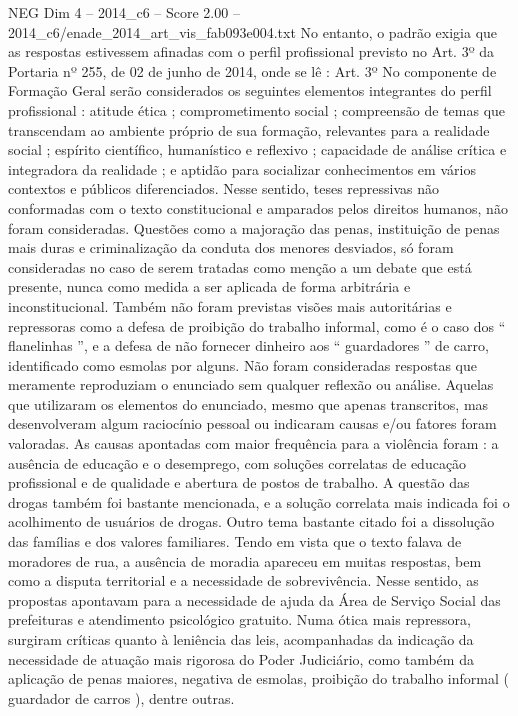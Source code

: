 \begin{textsample}{NEG Dim 4 – 2014\_c6 – Score 2.00 – 2014\_c6/enade\_2014\_art\_vis\_fab093e004.txt}
No entanto, o padrão exigia que as respostas estivessem afinadas com o perfil profissional previsto no Art. 3º da Portaria nº 255, de 02 de junho de 2014, onde se lê : Art. 3º No componente de Formação Geral serão considerados os seguintes elementos integrantes do perfil profissional : atitude ética ; comprometimento social ; compreensão de temas que transcendam ao ambiente próprio de sua formação, relevantes para a realidade social ; espírito científico, humanístico e reflexivo ; capacidade de análise crítica e integradora da realidade ; e aptidão para socializar conhecimentos em vários contextos e públicos diferenciados.
Nesse sentido, teses repressivas não conformadas com o texto constitucional e amparados pelos direitos humanos, não foram consideradas.
Questões como a majoração das penas, instituição de penas mais duras e criminalização da conduta dos menores desviados, só foram consideradas no caso de serem tratadas como menção a um debate que está presente, nunca como medida a ser aplicada de forma arbitrária e inconstitucional.
Também não foram previstas visões mais autoritárias e repressoras como a defesa de proibição do trabalho informal, como é o caso dos “ flanelinhas ”, e a defesa de não fornecer dinheiro aos “ guardadores ” de carro, identificado como esmolas por alguns.
Não foram consideradas respostas que meramente reproduziam o enunciado sem qualquer reflexão ou análise.
Aquelas que utilizaram os elementos do enunciado, mesmo que apenas transcritos, mas desenvolveram algum raciocínio pessoal ou indicaram causas e/ou fatores foram valoradas.
As causas apontadas com maior frequência para a violência foram : a ausência de educação e o desemprego, com soluções correlatas de educação profissional e de qualidade e abertura de postos de trabalho.
A questão das drogas também foi bastante mencionada, e a solução correlata mais indicada foi o acolhimento de usuários de drogas.
Outro tema bastante citado foi a dissolução das famílias e dos valores familiares.
Tendo em vista que o texto falava de moradores de rua, a ausência de moradia apareceu em muitas respostas, bem como a disputa territorial e a necessidade de sobrevivência.
Nesse sentido, as propostas apontavam para a necessidade de ajuda da Área de Serviço Social das prefeituras e atendimento psicológico gratuito.
Numa ótica mais repressora, surgiram críticas quanto à leniência das leis, acompanhadas da indicação da necessidade de atuação mais rigorosa do Poder Judiciário, como também da aplicação de penas maiores, negativa de esmolas, proibição do trabalho informal ( guardador de carros ), dentre outras.

\end{textsample}
